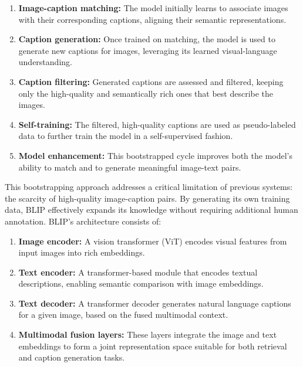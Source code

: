 \documentclass[conference]{IEEEtran}
\begin{document}
\begin{enumerate}
\begin{enumerate}
    \item \textbf{Image-caption matching:} The model initially learns to associate images with their corresponding captions, aligning their semantic representations.
    
    \item \textbf{Caption generation:} Once trained on matching, the model is used to generate new captions for images, leveraging its learned visual-language understanding.
    
    \item \textbf{Caption filtering:} Generated captions are assessed and filtered, keeping only the high-quality and semantically rich ones that best describe the images.
    
    \item \textbf{Self-training:} The filtered, high-quality captions are used as pseudo-labeled data to further train the model in a self-supervised fashion.
    
    \item \textbf{Model enhancement:} This bootstrapped cycle improves both the model’s ability to match and to generate meaningful image-text pairs.
\end{enumerate}

This bootstrapping approach addresses a critical limitation of previous systems: the scarcity of high-quality image-caption pairs. By generating its own training data, BLIP effectively expands its knowledge without requiring additional human annotation.
BLIP's architecture consists of:

\begin{enumerate}
    \item \textbf{Image encoder:} A vision transformer (ViT) encodes visual features from input images into rich embeddings.
    
    \item \textbf{Text encoder:} A transformer-based module that encodes textual descriptions, enabling semantic comparison with image embeddings.
    
    \item \textbf{Text decoder:} A transformer decoder generates natural language captions for a given image, based on the fused multimodal context.
    
    \item \textbf{Multimodal fusion layers:} These layers integrate the image and text embeddings to form a joint representation space suitable for both retrieval and caption generation tasks.
\end{enumerate}


\end{enumerate}
\end{document}

